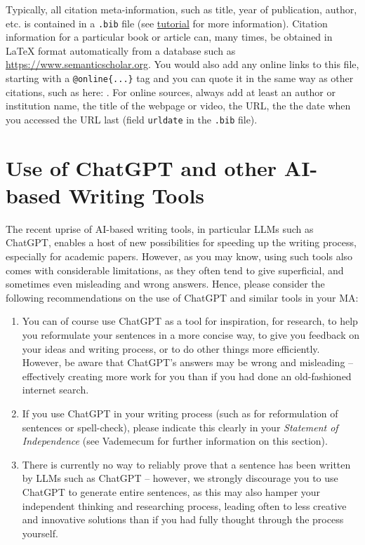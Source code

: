 Typically, all citation meta-information, such as title, year of publication, author, etc. is contained in a \texttt{.bib} file (see \href{https://de.overleaf.com/learn/latex/Bibliography_management_with_biblatex}{tutorial} for more information). Citation information for a particular book or article can, many times, be obtained in \LaTeX{} format automatically from a database such as \url{https://www.semanticscholar.org}. You would also add any online links to this file, starting with a \lstinline|@online{...}| tag and you can quote it in the same way as other citations, such as here: \cite{Datenstrukturen}. For online sources, always add at least an author or institution name, the title of the webpage or video, the \gls{URL}, the  the date when you accessed the \gls{URL} last (field \lstinline|urldate| in the \texttt{.bib} file).

\section{Use of ChatGPT and other \acrshort{AI}-based Writing Tools}

The recent uprise of \gls{AI}-based writing tools, in particular \glspl{LLM} such as ChatGPT, enables a host of new possibilities for speeding up the writing process, especially for academic papers. However, as you may know, using such tools also comes with considerable limitations, as they often tend to give superficial, and sometimes even misleading and wrong answers. Hence, please consider the following recommendations on the use of ChatGPT and similar tools in your \gls{MA}:

\begin{enumerate}
	\item You can of course use ChatGPT as a tool for inspiration, for research, to help you reformulate your sentences in a more concise way, to give you feedback on your ideas and writing process, or to do other things more efficiently. However, be aware that ChatGPT's answers may be wrong and misleading -- effectively creating more work for you than if you had done an old-fashioned internet search.
	\item If you use ChatGPT in your writing process (such as for reformulation of sentences or spell-check), please indicate this clearly in your \textit{Statement of Independence} (see Vademecum for further information on this section).
	\item There is currently no way to reliably prove that a sentence has been written by \glspl{LLM} such as ChatGPT -- however, we strongly discourage you to use ChatGPT to generate entire sentences, as this may also hamper your independent thinking and researching process, leading often to less creative and innovative solutions than if you had fully thought through the process yourself.
\end{enumerate}


